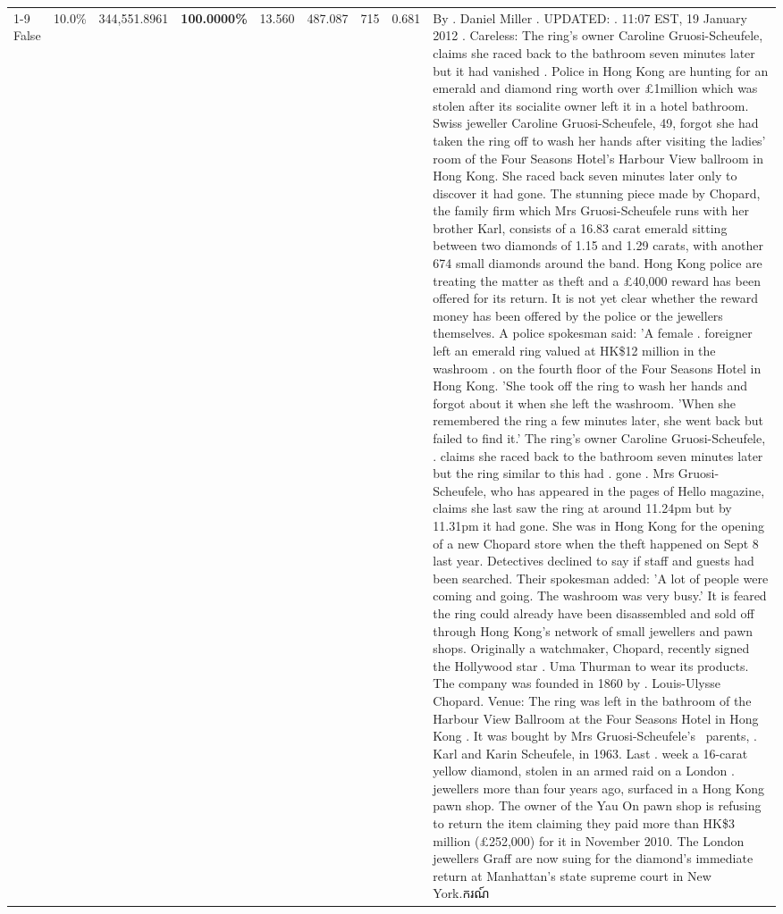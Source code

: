 \begin{table}[H]
\begin{tabular}{lllrlllll}
\cline{1-9}
False & 10.0\% & 344,551.8961 & \bfseries \color{red} 100.0000\% & 13.560 & 487.087 & 715 & 0.681 & By . Daniel Miller . UPDATED: . 11:07 EST, 19 January 2012 . Careless: The ring's owner Caroline Gruosi-Scheufele, claims she raced back to the bathroom seven minutes later but it had vanished . Police in Hong Kong are hunting for an emerald and diamond ring worth over £1million which was stolen after its socialite owner left it in a hotel bathroom. Swiss jeweller Caroline Gruosi-Scheufele, 49, forgot she had taken the ring off to wash her hands after visiting the ladies' room of the Four Seasons Hotel's Harbour View ballroom in Hong Kong. She raced back seven minutes later only to discover it had gone. The stunning piece made by Chopard, the family firm which Mrs Gruosi-Scheufele runs with her brother Karl, consists of a 16.83 carat emerald sitting between two diamonds of 1.15 and 1.29 carats, with another 674 small diamonds around the band. Hong Kong police are treating the matter as theft and a £40,000 reward has been offered for its return. It is not yet clear whether the reward money has been offered by the police or the jewellers themselves. A police spokesman said: 'A female . foreigner left an emerald ring valued at HK\$12 million in the washroom . on the fourth floor of the Four Seasons Hotel in Hong Kong. 'She took off the ring to wash her hands and forgot about it when she left the washroom. 'When she remembered the ring a few minutes later, she went back but failed to find it.' The ring's owner Caroline Gruosi-Scheufele, . claims she raced back to the bathroom seven minutes later but the ring similar to this had . gone . Mrs Gruosi-Scheufele, who has appeared in the pages of Hello magazine, claims she last saw the ring at around 11.24pm but by 11.31pm it had gone. She was in Hong Kong for the opening of a new Chopard store when the theft happened on Sept 8 last year. Detectives declined to say if staff and guests had been searched. Their spokesman added: 'A lot of people were coming and going. The washroom was very busy.' It is feared the ring could already have been disassembled and sold off through Hong Kong's network of small jewellers and pawn shops. Originally a watchmaker, Chopard, recently signed the Hollywood star . Uma Thurman to wear its products. The company was founded in 1860 by . Louis-Ulysse Chopard. Venue: The ring was left in the bathroom of the Harbour View Ballroom at the Four Seasons Hotel in Hong Kong . It was bought by Mrs Gruosi-Scheufele's  parents, . Karl and Karin Scheufele, in 1963. Last . week a 16-carat yellow diamond, stolen in an armed raid on a London . jewellers more than four years ago, surfaced in a Hong Kong pawn shop. The owner of the Yau On pawn shop is refusing to return the item claiming they paid more than HK\$3 million (£252,000) for it in November 2010. The London jewellers Graff are now suing for the diamond’s immediate return at Manhattan’s state supreme court in New York.ករណ៍ \\

\end{tabular}
\end{table}
